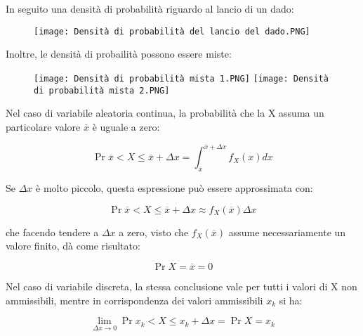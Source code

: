 In seguito una densità di probabilità riguardo al lancio di un dado: 

\begin{figure}[h]
    \centering
    \texttt{[image: Densità di probabilità del lancio del dado.PNG]}
\end{figure} 

\newpage 

Inoltre, le densità di probailità possono essere miste: 

\begin{figure}[h]
    \centering
    \texttt{[image: Densità di probabilità mista 1.PNG]}
    \texttt{[image: Densità di probabilità mista 2.PNG]} 
\end{figure} 

Nel caso di variabile aleatoria continua, la probabilità che la X assuma un particolare valore $\overline{x}$ è uguale a zero: 

{
    \Large 
    \begin{equation}
        \Pr{\overline{x} < X \leq \overline{x} + \Delta x}
        = 
        \int_{\overline{x}}^{\overline{x} + \Delta x}
        f_X (x) dx
    \end{equation}
}


Se $\Delta x$ è molto piccolo, questa espressione può essere approssimata con: 

{
    \Large 
    \begin{equation}
        \Pr{\overline{x} < X \leq \overline{x} + \Delta x} 
        \approx 
        f_X (\overline{x}) \Delta x
    \end{equation}
}

che facendo tendere a $\Delta x$ a zero, visto che $f_X (\overline{x})$ assume necessariamente un valore finito, 
dà come risultato: 

{
    \Large 
    \begin{equation}
        \Pr{X = \overline{x}} 
        = 
        0
    \end{equation}
}

Nel caso di variabile discreta, 
la stessa conclusione vale per tutti i valori di X non ammissibili, 
mentre in corrispondenza dei valori ammissibili $x_k$ si ha: 

{
    \Large 
    \begin{equation}
        \lim_{\Delta x \rightarrow 0}
        \Pr{x_k < X \leq x_k + \Delta x}
        = 
        \Pr{X = x_k}
    \end{equation}
}

